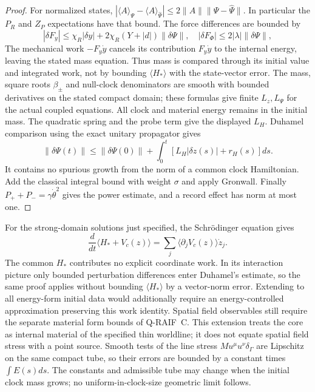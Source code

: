 \documentclass[12pt,a4paper]{article}
\begin{document}
\begin{proof}
For normalized states,
$|\langle A\rangle_\Psi-\langle A\rangle_{\widehat\Psi}|
\le2\|A\|\|\Psi-\widehat\Psi\|$.
In particular the $P_R$ and $Z_P$ expectations have that bound.
The force differences are bounded by
\[
 |\delta F_y|\le\chi_R|\delta y|
       +2\chi_R(Y+|d|)\|\delta\Psi\|,\quad
 |\delta F_\Phi|\le2|\lambda|\|\delta\Psi\|,
\]
The mechanical work $-F_y\dot y$ cancels its contribution
$F_y\dot y$ to the internal energy, leaving the stated mass equation.
Thus mass is compared through its initial value and integrated work,
not by bounding $\langle H_*\rangle$ with the state-vector error.
The mass, square roots $\beta_\pm$ and null-clock denominators
are smooth with bounded derivatives on the stated compact domain;
these formulas give finite $L_z,L_\Psi$ for the actual coupled
equations. All clock and material energy remains in the initial mass.
The quadratic spring and the probe term give the displayed $L_H$.
Duhamel comparison using the exact unitary propagator gives
\[
 \|\delta\Psi(t)\|\le\|\delta\Psi(0)\|
    +\int_0^t[L_H|\delta z(s)|+r_H(s)]ds.
\]
It contains no spurious growth from the norm of a common clock
Hamiltonian. Add the classical integral bound with weight $\sigma$
and apply Gronwall. Finally $P_++P_-=\gamma\dot\theta^2$ gives
the power estimate, and a record effect has norm at most one.
\end{proof}

For the strong-domain solutions just specified, the Schr\"odinger
equation gives
\[
 \frac{d}{dt}\langle H_*+V_c(z)\rangle
 =\sum_j\langle\partial_jV_c(z)\rangle\dot z_j.
\]
The common $H_*$ contributes no explicit coordinate work. In its
interaction picture only bounded perturbation differences enter
Duhamel's estimate, so the same proof applies without bounding
$\langle H_*\rangle$ by a vector-norm error. Extending to all
energy-form initial data would additionally require an energy-controlled
approximation preserving this work identity. Spatial field observables
still require the separate material form bounds of Q-RAIF~C.
This extension treats the core as internal material of the specified
thin worldline; it does not equate spatial field stress with a point
source. Smooth tests of the line stress
$M u^\mu u^\nu\delta_\Gamma$ are Lipschitz on the same compact tube,
so their errors are bounded by a constant times $\int E(s)ds$.
The constants and admissible tube may change when the initial clock
mass grows; no uniform-in-clock-size geometric limit follows.
\end{document}

